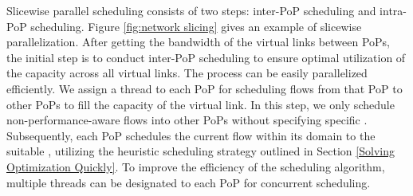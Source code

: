 



Slicewise parallel scheduling consists of two steps: inter-PoP scheduling and intra-PoP scheduling. Figure \ref{fig:network slicing} gives an example of slicewise parallelization. After getting the bandwidth of the virtual links between PoPs, the initial step is to conduct inter-PoP scheduling to ensure optimal utilization of the capacity across all virtual links. The process can be easily parallelized efficiently. We assign a thread to each PoP for scheduling flows from that PoP to other PoPs to fill the capacity of the virtual link. In this step, we only schedule non-performance-aware flows into other PoPs without specifying specific {\egress}. Subsequently, each PoP schedules the current flow within its domain to the suitable {\egress}, utilizing the heuristic scheduling strategy outlined in Section \ref{Solving Optimization Quickly}. To improve the efficiency of the scheduling algorithm, multiple threads can be designated to each PoP for concurrent scheduling.

